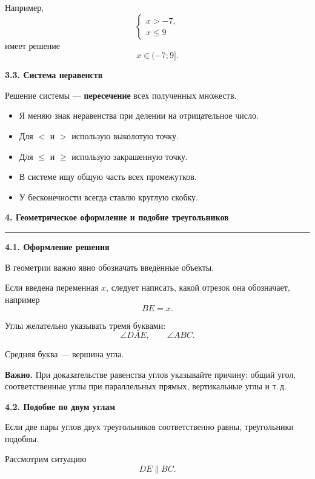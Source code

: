 \documentclass[a4paper,12pt]{article}
\newcommand{\topic}[1]{%
  \vspace{0.4em}
  {\Large\bfseries\color{darkaccent}#1\par}
  \vspace{0.25em}
  {\color{accent}\rule{\linewidth}{0.7pt}}
  \vspace{0.45em}
}
\newcommand{\subtopic}[1]{%
  \vspace{0.5em}
  {\large\bfseries\color{darkaccent}#1\par}
  \vspace{0.2em}
}
\newcommand{\important}[1]{%
  \par\vspace{0.3em}
  {\color{darkaccent}\bfseries Важно.} #1
  \par\vspace{0.3em}
}
\newcommand{\checkliststart}{%
  \begin{itemize}[label={\(\square\)},leftmargin=8mm]
}
\newcommand{\checklistend}{\end{itemize}}
\begin{document}
Например,
\[
\begin{cases}
x>-7,\\
x\le9
\end{cases}
\]
имеет решение
\[
\boxed{x\in(-7;9]}.
\]

\subtopic{3.3. Система неравенств}

Решение системы --- \textbf{пересечение} всех полученных множеств.

\checkliststart
\item Я меняю знак неравенства при делении на отрицательное число.
\item Для \(<\) и \(>\) использую выколотую точку.
\item Для \(\le\) и \(\ge\) использую закрашенную точку.
\item В системе ищу общую часть всех промежутков.
\item У бесконечности всегда ставлю круглую скобку.
\checklistend

\topic{4. Геометрическое оформление и подобие треугольников}

\subtopic{4.1. Оформление решения}

В геометрии важно явно обозначать введённые объекты.

Если введена переменная \(x\), следует написать, какой отрезок она обозначает, например
\[
BE=x.
\]

Углы желательно указывать тремя буквами:
\[
\angle DAE,\qquad \angle ABC.
\]

Средняя буква --- вершина угла.

\important{При доказательстве равенства углов указывайте причину: общий угол, соответственные углы при параллельных прямых, вертикальные углы и т.\,д.}

\subtopic{4.2. Подобие по двум углам}

Если две пары углов двух треугольников соответственно равны, треугольники подобны.

Рассмотрим ситуацию
\[
DE\parallel BC.
\]

\begin{center}
\end{center}
\end{document}
